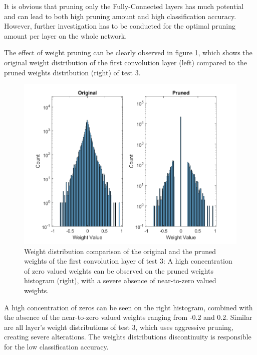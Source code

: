 It is obvious that pruning only the Fully-Connected layers has much potential and can lead to both high pruning amount and high classification accuracy. However, further investigation has to be conducted for the optimal pruning amount per layer on the whole network.

The effect of weight pruning can be clearly observed in figure \ref{fig:weight-distribution-comparison-pruned-conv1-test3}, which shows the original weight distribution of the first convolution layer (left) compared to the pruned weights distribution (right) of test 3.

\begin{figure} [H]
	\centering
	\includegraphics[width=\textwidth]{../Images/Weights-distributions/pruned/41.22/weight-distribution-conv1.png}
	\decoRule
	\caption[Weight distribution comparison of the original and the pruned weights of the first convolution layer of test 3]{Weight distribution comparison of the original and the pruned weights of the first convolution layer  of test 3: A high concentration of zero valued weights can be observed on the pruned weights histogram (right), with a severe absence of near-to-zero valued weights.}
	\label{fig:weight-distribution-comparison-pruned-conv1-test3}
\end{figure}

A high concentration of zeros can be seen on the right histogram, combined with the absence of the near-to-zero valued weights ranging from -0.2 and 0.2. Similar are all layer's weight distributions of test 3, which uses aggressive pruning, creating severe alterations. The weights distributions discontinuity is responsible for the low classification accuracy.

